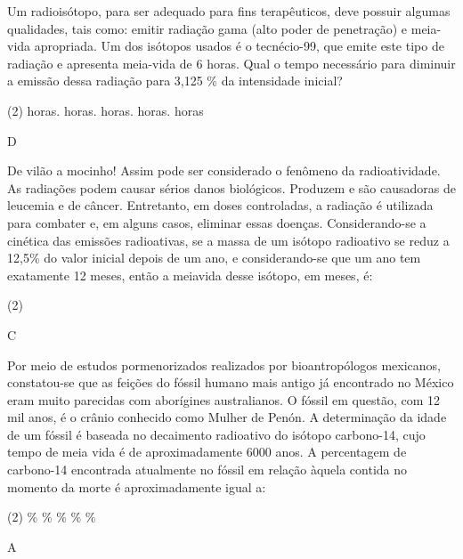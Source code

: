 \documentclass[9 pt]{scrartcl}
\begin{document}
\begin{exercise}[points=1.0]
Um radioisótopo, para ser adequado para fins terapêuticos, deve possuir algumas qualidades, tais como: emitir radiação gama (alto poder de penetração) e meia-vida apropriada. Um dos isótopos usados é o tecnécio-99, que emite este tipo de radiação e apresenta meia-vida de 6 horas. Qual o tempo necessário para diminuir a emissão dessa radiação para 3,125 \% da intensidade inicial?

\begin{choice}(2)
 horas.
 horas.
 horas.
 horas.
 horas
\end{choice}
\end{exercise}
\begin{solution}
D
\end{solution}





\begin{exercise}[points=1.0]
De vilão a mocinho! Assim pode ser considerado o fenômeno da radioatividade. As radiações podem causar sérios danos biológicos. Produzem e são causadoras de leucemia e de câncer. Entretanto, em doses controladas, a radiação é utilizada para combater e, em alguns casos, eliminar essas doenças. Considerando-se a cinética das emissões radioativas, se a massa de um isótopo radioativo se reduz a 12,5\% do valor inicial depois de um ano, e considerando-se que um ano tem exatamente 12 meses, então a meiavida desse isótopo, em meses, é:

\begin{choice}(2)
\end{choice}
\end{exercise}
\begin{solution}
C
\end{solution}




\begin{exercise}[points=1.0]
Por meio de estudos pormenorizados realizados por bioantropólogos mexicanos, constatou-se que as feições do fóssil humano mais antigo já encontrado no México eram muito parecidas com aborígines australianos. O fóssil em questão, com 12 mil anos, é o crânio conhecido como Mulher de Penón. A determinação da idade de um fóssil é baseada no decaimento radioativo do isótopo carbono-14, cujo tempo de meia vida é de aproximadamente 6000 anos. A percentagem de carbono-14 encontrada atualmente no fóssil em relação àquela contida no momento da morte é aproximadamente igual a:

\begin{choice}(2)
 \%
 \%
 \%
 \%
 \%
\end{choice}
\end{exercise}
\begin{solution}
A
\end{solution}
\end{document}
